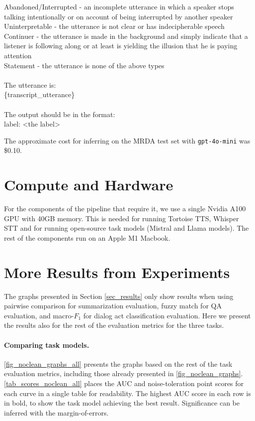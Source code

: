 \begin{tcolorbox}[colback=gray!10, colframe=gray!50, sharp corners, boxrule=0.5mm]
{{Abandoned/Interrupted - an incomplete utterance in which a speaker stops talking intentionally or on account of being interrupted by another speaker\\
Uninterpretable - the utterance is not clear or has indecipherable speech\\
Continuer - the utterance is made in the background and simply indicate that a listener is following along or at least is yielding the illusion that he is paying attention\\
Statement - the utterance is none of the above types\\\\
The utterance is:\\
\{transcript\_utterance\}\\\\
The output should be in the format:\\
label: <the label>}}
\end{tcolorbox}

The approximate cost for inferring on the MRDA test set with \texttt{gpt-4o-mini} was \$0.10.



\section{Compute and Hardware}
\label{sec_appendix_compute}
For the components of the pipeline that require it, we use a single Nvidia A100 GPU with 40GB memory. This is needed for running Tortoise TTS, Whisper STT and for running open-source task models (Mistral and Llama models). The rest of the components run on an Apple M1 Macbook.

\section{More Results from Experiments}
\label{sec_appendix_results}
The graphs presented in Section \ref{sec_results} only show results when using pairwise comparison for summarization evaluation, fuzzy match for QA evaluation, and macro-$F_1$ for dialog act classification evaluation. Here we present the results also for the rest of the evaluation metrics for the three tasks.

\paragraph{Comparing task models.}
\autoref{fig_noclean_graphs_all} presents the graphs based on the rest of the task evaluation metrics, including those already presented in \autoref{fig_noclean_graphs}. \autoref{tab_scores_noclean_all} places the AUC and noise-toleration point scores for each curve in a single table for readability. The highest AUC score in each row is in bold, to show the task model achieving the best result. Significance can be inferred with the margin-of-errors.

